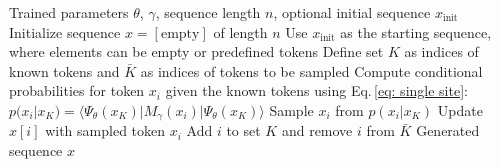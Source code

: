\documentclass[aps,prb,twocolumn,superscriptaddress]{revtex4-2}
\newcommand{\ket}[1]{|#1 \rangle}
\newcommand{\vect}[1]{{\bm{#1}}}
\newcommand{\eqnref}[1]{Eq.\,\eqref{#1}}
\newcommand{\yzy}[1]{{\color[rgb]{0.70,0.13,0.13}{\textsf{YZY}: #1}}}
\newcommand{\hwd}[1]{{\color[rgb]{0.20,0.18,0.8}{\textsf{HWD}: #1}}}
\begin{document}

\begin{algorithm}[H]
\caption{Generative Sampling with Conditional Dependencies}
\label{alg:gen}
\begin{algorithmic}
\REQUIRE Trained parameters $\theta$, $\gamma$, sequence length $n$, optional initial sequence $x_{\text{init}}$
    \STATE Initialize sequence $x = [ \text{empty} ]$ of length $n$
\ELSE
    \STATE Use $x_{\text{init}}$ as the starting sequence, where elements can be empty or predefined tokens
\ENDIF
\STATE Define set $K$ as indices of known tokens and $\bar{K}$ as indices of tokens to be sampled
            \STATE Compute conditional probabilities for token $x_i$ given the known tokens using \eqnref{eq: single site}:
            \STATE $p(x_i|x_{K}) = \langle \Psi_{\theta}(x_{K}) | M_{\gamma}(x_i) | \Psi_{\theta}(x_{K}) \rangle$
            \STATE Sample $x_i$ from $p(x_i|x_{K})$
            \STATE Update $x[i]$ with sampled token $x_i$
            \STATE Add $i$ to set $K$ and remove $i$ from $\bar{K}$
        \ENDIF
    \ENDFOR
\ENDWHILE
\ENSURE Generated sequence $x$
\end{algorithmic}
\end{algorithm}
\end{document}
